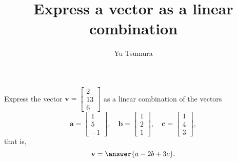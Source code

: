 \documentclass{ximera}
\title{Express a vector as a linear combination}
\author{Yu Tsumura}
\begin{document}
\begin{exercise}
  
Express the vector $\mathbf{v}=\begin{bmatrix}
  2 \\
  13 \\
  6 
\end{bmatrix}$ as a linear combination of the vectors
\[\mathbf{a}=\begin{bmatrix}
    1 \\
    5 \\
    -1 
  \end{bmatrix}, \quad
  \mathbf{b}=
  \begin{bmatrix}
    1 \\
    2 \\
    1 
  \end{bmatrix}, \quad
  \mathbf{c}=
  \begin{bmatrix}
    1 \\
    4 \\
    3 
  \end{bmatrix},\]
that is,
\[
  \mathbf{v} = \answer{a-2b+3c}.
\]

\end{exercise}



		 
\end{document}
